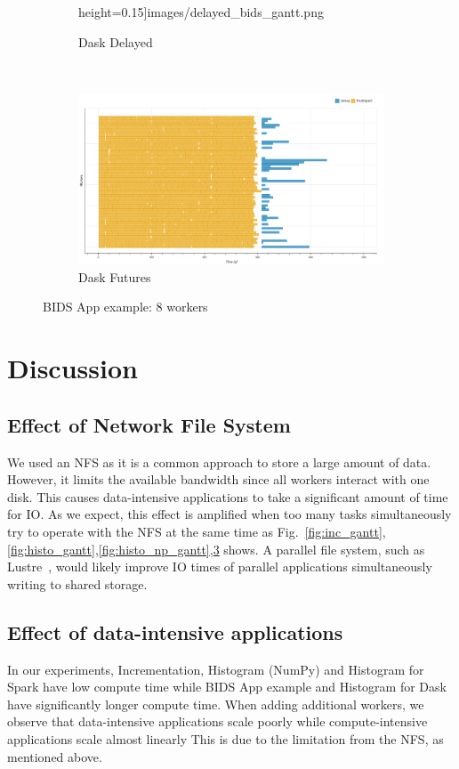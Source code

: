 \documentclass[conference]{IEEEtran}
\begin{document}
\begin{figure}[!htb]
\begin{subfigure}[b]{\columnwidth}
        height=0.15\textheight]{images/delayed_bids_gantt.png}%
        \caption{Dask Delayed}\label{fig:bids_dask_delayed_gantt}
    \end{subfigure}
    \\
    \begin{subfigure}[b]{\columnwidth}
        \includegraphics[clip,width=\columnwidth,
        height=0.15\textheight]{images/futures_bids_gantt.png}%
        \caption{Dask Futures}\label{fig:bids_dask_futures_gantt}
    \end{subfigure}
    \caption{BIDS App example: 8 workers}\label{fig:bids_gantt}
\end{figure}



\section{Discussion}

\subsection{Effect of Network File System}
We used an NFS as it is a common approach to store a large amount of data. However,
it limits the available bandwidth since all workers interact with one disk. This
causes data-intensive applications to take a significant amount of time for IO. As we
expect, this effect is amplified when too many tasks simultaneously try to operate
with the NFS at the same time as
Fig.~\ref{fig:inc_gantt},\ref{fig:histo_gantt},\ref{fig:histo_np_gantt},\ref{fig:bids_gantt}
shows. A parallel file system, such as Lustre~\cite{lustre}, would likely improve
IO times of parallel applications simultaneously writing to shared storage.

\subsection{Effect of data-intensive applications}
In our experiments, Incrementation, Histogram (NumPy) and Histogram for Spark have
low compute time while BIDS App example and Histogram for Dask have significantly
longer compute time. When adding additional workers, we observe that data-intensive
applications scale poorly while compute-intensive applications scale almost linearly
This is due to the limitation from the NFS, as mentioned above.
\end{document}
